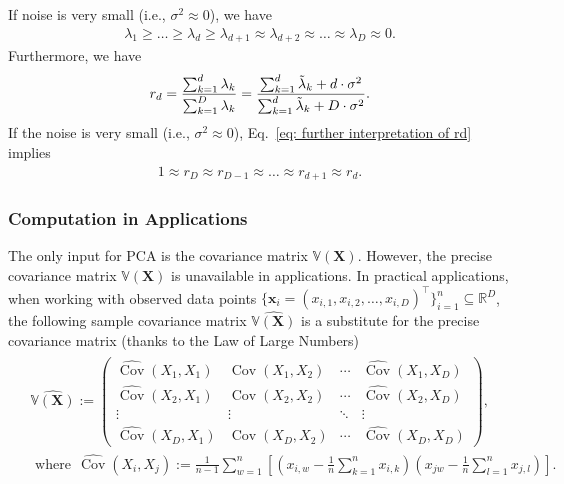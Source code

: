 \documentclass[11pt,letterpaper, leqno]{article}
\numberwithin{equation}{section}
\numberwithin{theorem}{section}
\numberwithin{lemma}{section}
\numberwithin{corollary}{section}
\numberwithin{definition}{section}
\numberwithin{proposition}{section}
\numberwithin{remark}{section}
\numberwithin{example}{section}
\newcommand{\T}{\intercal}
\begin{document}
If noise is very small (i.e., $\sigma^2\approx0$), we have
\begin{align*}
    \lambda_1\ge\ldots\ge\lambda_d\ge\lambda_{d+1}\approx\lambda_{d+2}\approx\ldots\approx\lambda_D\approx0.
\end{align*}
Furthermore, we have
\begin{align}\label{eq: further interpretation of rd}
    r_d = \frac{\sum_{k=1}^d \lambda_k}{\sum_{k=1}^D \lambda_k} = \frac{\sum_{k=1}^d \Tilde{\lambda}_k +d\cdot\sigma^2}{\sum_{k=1}^d \Tilde{\lambda}_k + D\cdot\sigma^2}.
\end{align}
If the noise is very small (i.e., $\sigma^2\approx0$), Eq.~\eqref{eq: further interpretation of rd} implies
\begin{align*}
    1\approx r_D \approx r_{D-1} \approx \ldots \approx r_{d+1} \approx r_d.
\end{align*}

\subsubsection{Computation in Applications}

The only input for PCA is the covariance matrix $\mathbb{V}(\boldsymbol{X})$. However, the precise covariance matrix $\mathbb{V}(\boldsymbol{X})$ is unavailable in applications. In practical applications, when working with observed data points $\{\boldsymbol{x}_i=(x_{i,1}, x_{i,2},\ldots, x_{i,D})^\T\}_{i=1}^n \subseteq\mathbb{R}^D$, the following sample covariance matrix $\widehat{\mathbb{V}(\boldsymbol{X})}$ is a substitute for the precise covariance matrix (thanks to the Law of Large Numbers)
\begin{align}\label{eq: sample covariance}
    \begin{aligned}
        & \widehat{\mathbb{V}(\boldsymbol{X})}:=
    \begin{pmatrix}
        \widehat{\operatorname{Cov}}(X_1,X_1) & \widehat{\operatorname{Cov}}(X_1,X_2) & \cdots & \widehat{\operatorname{Cov}}(X_1,X_D) \\
        \widehat{\operatorname{Cov}}(X_2,X_1) & \widehat{\operatorname{Cov}}(X_2,X_2) & \cdots & \widehat{\operatorname{Cov}}(X_2,X_D) \\
        \vdots & \vdots & \ddots & \vdots \\
        \widehat{\operatorname{Cov}}(X_D,X_1) & \widehat{\operatorname{Cov}}(X_D,X_2) & \cdots & \widehat{\operatorname{Cov}}(X_D,X_D)
    \end{pmatrix}, \\
    & \mbox{ where}\ \ \widehat{\operatorname{Cov}}(X_i,X_j):=\frac{1}{n-1}\sum_{w=1}^n \left[\left(x_{i,w}-\frac{1}{n}\sum_{k=1}^n x_{i,k}\right)\left(x_{jw}-\frac{1}{n}\sum_{l=1}^n x_{j,l}\right)\right].
    \end{aligned}
\end{align}
\end{document}
